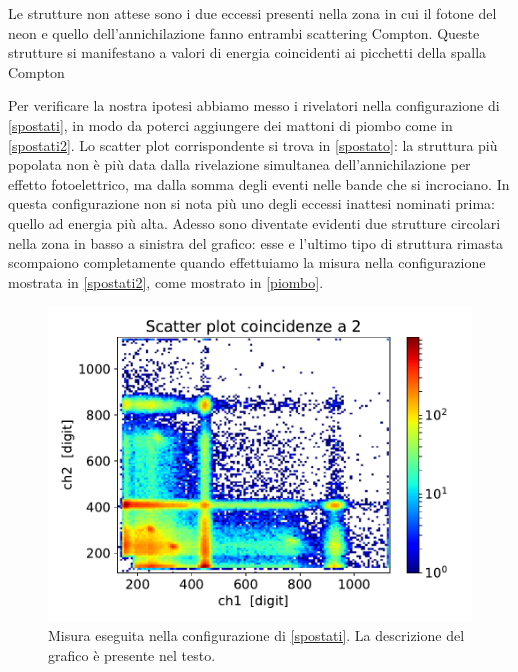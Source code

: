 
Le strutture non attese sono i due eccessi presenti nella zona in cui il fotone del neon e quello dell'annichilazione fanno entrambi scattering Compton. Queste strutture si manifestano a valori di energia coincidenti ai picchetti della spalla Compton

Per verificare la nostra ipotesi abbiamo messo i rivelatori nella configurazione di \autoref{spostati}, in modo da poterci aggiungere dei mattoni di piombo come in \autoref{spostati2}. 
Lo scatter plot corrispondente si trova in \autoref{spostato}: la struttura più popolata non è più data dalla rivelazione simultanea dell'annichilazione per effetto fotoelettrico, ma dalla somma degli eventi nelle bande che si incrociano.
In questa configurazione non si nota più uno degli eccessi inattesi nominati prima: quello ad energia più alta. Adesso sono diventate evidenti due strutture circolari nella zona in basso a sinistra del grafico: esse e l'ultimo tipo di struttura rimasta scompaiono completamente quando effettuiamo la misura nella configurazione mostrata in \autoref{spostati2}, come mostrato in \autoref{piombo}.

\begin{figure}[h]
\centering
\includegraphics[width=\textwidth]{immagini/0518_rimbalzi}
\caption{Misura eseguita nella configurazione di \autoref{spostati}. La descrizione del grafico è presente nel testo.}
\label{spostato}
\end{figure}

